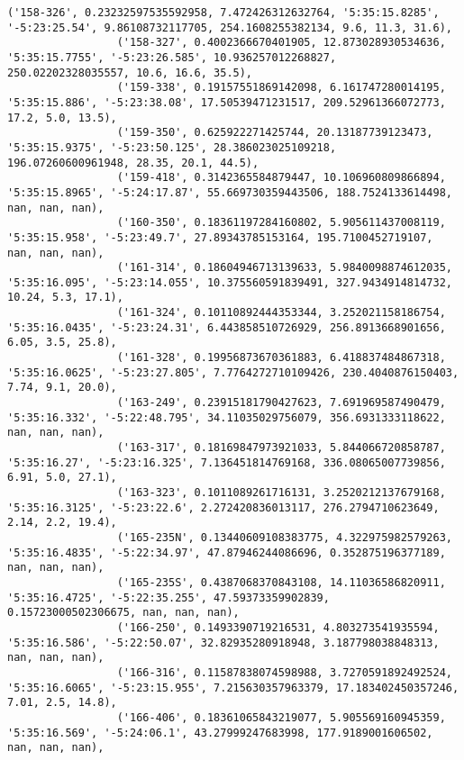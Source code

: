 \documentclass{article}
\begin{document}
\begin{Verbatim}[commandchars=\\\{\}]
                 ('158-326', 0.23232597535592958, 7.472426312632764, '5:35:15.8285', '-5:23:25.54', 9.86108732117705, 254.1608255382134, 9.6, 11.3, 31.6),
                 ('158-327', 0.4002366670401905, 12.873028930534636, '5:35:15.7755', '-5:23:26.585', 10.936257012268827, 250.02202328035557, 10.6, 16.6, 35.5),
                 ('159-338', 0.19157551869142098, 6.161747280014195, '5:35:15.886', '-5:23:38.08', 17.50539471231517, 209.52961366072773, 17.2, 5.0, 13.5),
                 ('159-350', 0.625922271425744, 20.13187739123473, '5:35:15.9375', '-5:23:50.125', 28.386023025109218, 196.07260600961948, 28.35, 20.1, 44.5),
                 ('159-418', 0.3142365584879447, 10.106960809866894, '5:35:15.8965', '-5:24:17.87', 55.669730359443506, 188.7524133614498, nan, nan, nan),
                 ('160-350', 0.18361197284160802, 5.905611437008119, '5:35:15.958', '-5:23:49.7', 27.89343785153164, 195.7100452719107, nan, nan, nan),
                 ('161-314', 0.18604946713139633, 5.9840098874612035, '5:35:16.095', '-5:23:14.055', 10.375560591839491, 327.9434914814732, 10.24, 5.3, 17.1),
                 ('161-324', 0.10110892444353344, 3.252021158186754, '5:35:16.0435', '-5:23:24.31', 6.443858510726929, 256.8913668901656, 6.05, 3.5, 25.8),
                 ('161-328', 0.19956873670361883, 6.418837484867318, '5:35:16.0625', '-5:23:27.805', 7.7764272710109426, 230.4040876150403, 7.74, 9.1, 20.0),
                 ('163-249', 0.23915181790427623, 7.691969587490479, '5:35:16.332', '-5:22:48.795', 34.11035029756079, 356.6931333118622, nan, nan, nan),
                 ('163-317', 0.18169847973921033, 5.844066720858787, '5:35:16.27', '-5:23:16.325', 7.136451814769168, 336.08065007739856, 6.91, 5.0, 27.1),
                 ('163-323', 0.1011089261716131, 3.2520212137679168, '5:35:16.3125', '-5:23:22.6', 2.272420836013117, 276.2794710623649, 2.14, 2.2, 19.4),
                 ('165-235N', 0.13440609108383775, 4.322975982579263, '5:35:16.4835', '-5:22:34.97', 47.87946244086696, 0.352875196377189, nan, nan, nan),
                 ('165-235S', 0.4387068370843108, 14.11036586820911, '5:35:16.4725', '-5:22:35.255', 47.59373359902839, 0.15723000502306675, nan, nan, nan),
                 ('166-250', 0.1493390719216531, 4.803273541935594, '5:35:16.586', '-5:22:50.07', 32.82935280918948, 3.187798038848313, nan, nan, nan),
                 ('166-316', 0.11587838074598988, 3.7270591892492524, '5:35:16.6065', '-5:23:15.955', 7.215630357963379, 17.183402450357246, 7.01, 2.5, 14.8),
                 ('166-406', 0.18361065843219077, 5.905569160945359, '5:35:16.569', '-5:24:06.1', 43.27999247683998, 177.9189001606502, nan, nan, nan),

\end{Verbatim}
\end{document}
